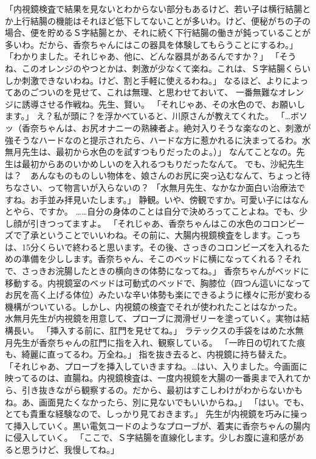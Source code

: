 「内視鏡検査で結果を見ないとわからない部分もあるけど、若い子は横行結腸とか上行結腸の機能はそれほど低下してないことが多いわ。けど、便秘がちの子の場合、便を貯めるＳ字結腸とか、それに続く下行結腸の働きが鈍っていることが多いわ。だから、香奈ちゃんにはこの器具を体験してもらうことにするわ。」
「わかりました。それじゃあ、他に、どんな器具があるんですか？」
「そうね、このオレンジのやつとかは、刺激が少なくて楽ね。これは、Ｓ字結腸くらいしか刺激できないわね。けど、割と手軽に使えるわね。」
なるほど、よりによってあのごついのを見せて、これは無理、と思わせておいて、
一番無難なオレンジに誘導させる作戦ね。先生、賢い。
「それじゃあ、その水色ので、お願いします。」
え？私が頭に？を浮かべていると、川原さんが教えてくれた。
「…ボソッ（香奈ちゃんは、お尻オナニーの熟練者よ。絶対入りそうな楽なのと、刺激が強そうなハードなのと提示されたら、ハードな方に惹かれるに決まってるわ。水無月先生は、最初から水色のを試すつもりだったのよ。）」
なんてことなの。先生は最初からあのいかめしいのを入れるつもりだったなんて。
でも、沙紀先生は？　あんなものものしい物体を、娘さんのお尻に突っ込むなんて、ちょっと待ちなさい、って物言いが入らないの？
「水無月先生、なかなか面白い治療法ですね。お手並み拝見いたします。」
静観。いや、傍観ですか。可愛い子にはなんとやら、ですか。
……自分の身体のことは自分で決めろってことよね。でも、少し顔が引きつってますよ。
「それじゃあ、香奈ちゃんはこの水色のコロンビーズで了承ということでいいわね。その前に、大腸内視鏡検査をします。こっちは、15分くらいで終わると思います。その後、さっきのコロンビーズを入れるための準備を少しします。香奈ちゃん、そこのベッドに横になってくれる？それで、さっきお浣腸したときの横向きの体勢になってね。」
香奈ちゃんがベッドに移動する。内視鏡室のベッドは可動式のベッドで、胸膝位（四つん這いになってお尻を高く上げる体位）みたいな辛い体勢も楽にできるように様々に形が変わる機構がついている。しかし、内視鏡の検査でそれが使われたことはなかった。
水無月先生が内視鏡を用意して、プローブに潤滑ゼリーを塗っていく。実物は結構長い。
「挿入する前に、肛門を見せてね。」
ラテックスの手袋をはめた水無月先生が香奈ちゃんの肛門に指を入れ、観察している。
「一昨日の切れてた痕も、綺麗に直ってるわ。万全ね。」
指を抜き去ると、内視鏡に持ち替えた。
「それじゃあ、プローブを挿入していきますね。…はい、入りました。今画面に映ってるのは、直腸ね。内視鏡検査は、一度内視鏡を大腸の一番奥まで入れてから、引き抜きながら観察するの。だから、最初はすこしわけがわからないかもね。あ、画面見たくなかったら、別に見ないでもいいからね。」
「はい。でも、とても貴重な経験なので、しっかり見ておきます。」
先生が内視鏡を巧みに操って挿入していく。黒い電気コードのようなプローブが、着実に香奈ちゃんの腸内に侵入していく。
「ここで、Ｓ字結腸を直線化します。少しお腹に違和感があると思うけど、我慢してね。」
